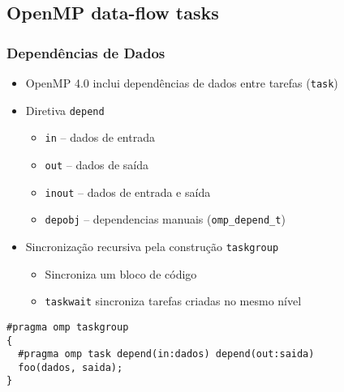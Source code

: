 \subsection{OpenMP data-flow tasks}

\begin{frame}[fragile]
  \frametitle{Dependências de Dados}
  \begin{itemize}
  \item OpenMP 4.0 inclui dependências de dados entre tarefas (\texttt{task})
  \pause
  \item Diretiva \texttt{depend}
    \begin{itemize}
    \item \texttt{in} -- dados de entrada
    \item \texttt{out} -- dados de saída
    \item \texttt{inout} -- dados de entrada e saída
    \item \texttt{depobj} -- dependencias manuais (\texttt{omp_depend_t})
    \end{itemize}
  \pause
  \item Sincronização recursiva pela construção \texttt{taskgroup}
    \begin{itemize}
    \item Sincroniza um bloco de código
    \item \texttt{taskwait} \alert{sincroniza tarefas criadas no mesmo nível}
    \end{itemize}
  \end{itemize}
%
\pause
%
\begin{minipage}{0.95\textwidth}  
  \begin{verbatim}  
#pragma omp taskgroup
{
  #pragma omp task depend(in:dados) depend(out:saida)
  foo(dados, saida);
}
\end{verbatim}
\end{minipage}
%
\end{frame}

